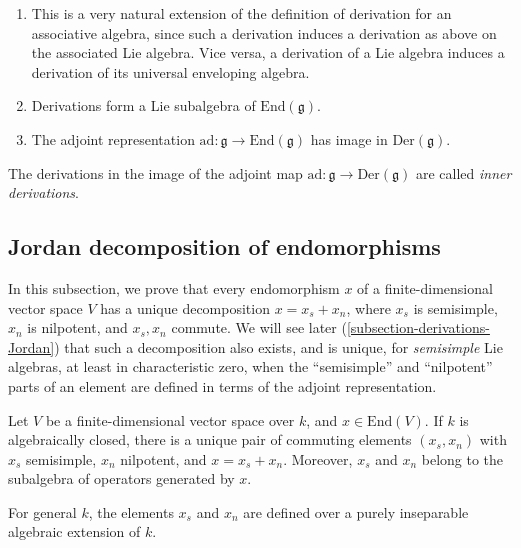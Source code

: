\begin{remarks}
\label{remarks-derivations}
 \begin{enumerate}
  \item This is a very natural extension of the definition of derivation for an associative algebra, since such a derivation induces a derivation as above on the associated Lie algebra. Vice versa, a derivation of a Lie algebra induces a derivation of its universal enveloping algebra.
  \item Derivations form a Lie subalgebra of $\text{End}(\mathfrak g)$.
  \item The adjoint representation $\text{ad}:\mathfrak g\to \text{End}(\mathfrak g)$ has image in $\text{Der}(\mathfrak g)$. 
 \end{enumerate}
\end{remarks}

\begin{definition}
 \label{definition-inner-derivation}
 The derivations in the image of the adjoint map $\text{ad}: \mathfrak g\to \text{Der}(\mathfrak g)$ are called {\it inner derivations}.
\end{definition}



\subsection{Jordan decomposition of endomorphisms}
\label{subsection-Jordan-endomorphisms}

In this subsection, we prove that every endomorphism $x$ of a finite-dimensional vector space $V$ has a unique decomposition $x=x_s+x_n$, where $x_s$ is semisimple, $x_n$ is nilpotent, and $x_s, x_n$ commute. We will see later (\ref{subsection-derivations-Jordan}) that such a decomposition also exists, and is unique, for \emph{semisimple} Lie algebras, at least in characteristic zero, when the ``semisimple'' and ``nilpotent'' parts of an element are defined in terms of the adjoint representation.

\begin{proposition}
\label{proposition-Jordan-endomorphisms}
 Let $V$ be a finite-dimensional vector space over $k$, and $x\in \text{End}(V)$. If $k$ is algebraically closed, there is a unique pair of commuting elements $(x_s, x_n)$ with $x_s$ semisimple, $x_n$ nilpotent, and $x=x_s+x_n$. Moreover, $x_s$ and $x_n$ belong to the subalgebra of operators generated by $x$.
 
 For general $k$, the elements $x_s$ and $x_n$ are defined over a purely inseparable algebraic extension of $k$. 
\end{proposition}

